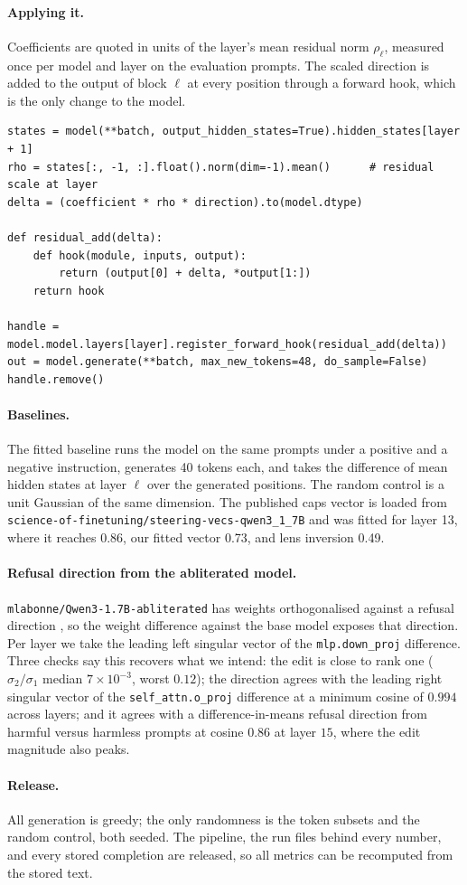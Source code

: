 \documentclass{article}
\begin{document}
\paragraph{Applying it.}
Coefficients are quoted in units of the layer's mean residual norm $\rho_\ell$, measured once per model and layer on the evaluation prompts. The scaled direction is added to the output of block $\ell$ at every position through a forward hook, which is the only change to the model.

\begin{lstlisting}[caption={Scaling and injection during generation.},label={lst:hook}]
states = model(**batch, output_hidden_states=True).hidden_states[layer + 1]
rho = states[:, -1, :].float().norm(dim=-1).mean()      # residual scale at layer
delta = (coefficient * rho * direction).to(model.dtype)

def residual_add(delta):
    def hook(module, inputs, output):
        return (output[0] + delta, *output[1:])
    return hook

handle = model.model.layers[layer].register_forward_hook(residual_add(delta))
out = model.generate(**batch, max_new_tokens=48, do_sample=False)
handle.remove()
\end{lstlisting}

\paragraph{Baselines.}
The fitted baseline runs the model on the same prompts under a positive and a negative instruction, generates 40 tokens each, and takes the difference of mean hidden states at layer $\ell$ over the generated positions. The random control is a unit Gaussian of the same dimension. The published caps vector is loaded from \texttt{science-of-finetuning/steering-vecs-qwen3\_1\_7B} and was fitted for layer 13, where it reaches 0.86, our fitted vector 0.73, and lens inversion 0.49.

\paragraph{Refusal direction from the abliterated model.}
\texttt{mlabonne/Qwen3-1.7B-abliterated} has weights orthogonalised against a refusal direction \citep{arditi2024refusal}, so the weight difference against the base model exposes that direction. Per layer we take the leading left singular vector of the \texttt{mlp.down\_proj} difference. Three checks say this recovers what we intend: the edit is close to rank one ($\sigma_2/\sigma_1$ median $7 \times 10^{-3}$, worst $0.12$); the direction agrees with the leading right singular vector of the \texttt{self\_attn.o\_proj} difference at a minimum cosine of $0.994$ across layers; and it agrees with a difference-in-means refusal direction from harmful versus harmless prompts at cosine $0.86$ at layer $15$, where the edit magnitude also peaks.

\paragraph{Release.}
All generation is greedy; the only randomness is the token subsets and the random control, both seeded. The pipeline, the run files behind every number, and every stored completion are released, so all metrics can be recomputed from the stored text.
\end{document}
